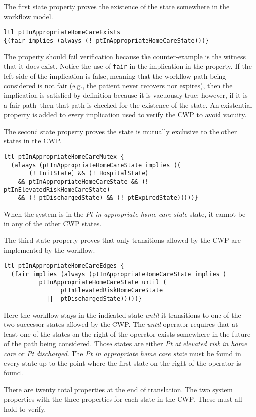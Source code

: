The first state property proves the existence of the state somewhere in the workflow model.
%
{\small
\begin{lstlisting}[style=myPromela]
ltl ptInAppropriateHomeCareExists 
{(fair implies (always (! ptInAppropriateHomeCareState)))}
\end{lstlisting}
}
%
\noindent The property should fail verification because the counter-example is the witness that it does exist. Notice the use of \texttt{fair} in the implication in the property. If the left side of the implication is false, meaning that the workflow path being considered is not fair (e.g., the patient never recovers nor expires), then the implication is satisfied by definition because it is vacuously true; however, if it is a fair path, then that path is checked for the existence of the state. An existential property is added to every implication used to verify the CWP to avoid vacuity.

The second state property proves the state is mutually exclusive to the other states in the CWP.
%
{\small
\begin{lstlisting}[style=myPromela]
ltl ptInAppropriateHomeCareMutex {
  (always (ptInAppropriateHomeCareState implies ((
       (! InitState) && (! HospitalState) 
    && ptInAppropriateHomeCareState && (! ptInElevatedRiskHomeCareState) 
    && (! ptDischargedState) && (! ptExpiredState)))))}
\end{lstlisting}
}
%
\noindent When the system is in the \emph{Pt in appropriate home care state} state, it cannot be in any of the other CWP states. 

The third state property proves that only transitions allowed by the CWP are implemented by the workflow.
%
{\small
\begin{lstlisting}[style=myPromela]
ltl ptInAppropriateHomeCareEdges {
  (fair implies (always (ptInAppropriateHomeCareState implies (
          ptInAppropriateHomeCareState until (
                ptInElevatedRiskHomeCareState
            ||  ptDischargedState)))))}
\end{lstlisting}
}
%
\noindent Here the workflow stays in the indicated state \emph{until} it transitions to one of the two successor states allowed by the CWP.  The \emph{until} operator requires that at least one of the states on the right of the operator exists somewhere in the future of the path being considered. Those states are either \emph{Pt at elevated risk in home care} or \emph{Pt discharged}. The \emph{Pt in appropriate home care state} must be found in every state up to the point where the first state on the right of the operator is found. 

There are twenty total properties at the end of translation. The two system properties with the three properties for each state in the CWP. These must all hold to verify.
